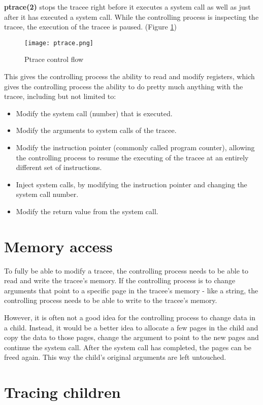 \documentclass[a4paper, twoside, 10pt, twocolumn]{report}
\begin{document}
\textbf{ptrace(2)} stops the tracee right before it executes a system call as
well as just after it has executed a system call.
While the controlling process is inspecting the tracee, the execution of the
tracee is paused. (Figure \ref{fig1})


\begin{figure}
\label{fig1}
\texttt{[image: ptrace.png]}
\caption{Ptrace control flow}
\end{figure}

This gives the controlling process the ability to read and modify registers,
which gives the controlling process the ability to do pretty much anything
with the tracee, including but not limited to:

\begin{itemize}
\item Modify the system call (number) that is executed.
\item Modify the arguments to system calls of the tracee.
\item Modify the instruction pointer (commonly called program counter), allowing
    the controlling process to resume the executing of the tracee at an entirely
    different set of instructions.
\item Inject system calls, by modifying the instruction pointer and changing the
    system call number.
\item Modify the return value from the system call.
\end{itemize}

\section{Memory access}

To fully be able to modify a tracee, the controlling process needs to be able to
read and write the tracee's memory. If the controlling process is to change
arguments that point to a specific page in the tracee's memory - like a string,
the controlling process needs to be able to write to the tracee's memory.

However, it is often not a good idea for the controlling process to change data
in a child. Instead, it would be a better idea to allocate a few pages in the
child and copy the data to those pages, change the argument to point to the new
pages and continue the system call. After the system call has completed, the
pages can be freed again. This way the child's original arguments are left
untouched.

\section{Tracing children}
\end{document}
